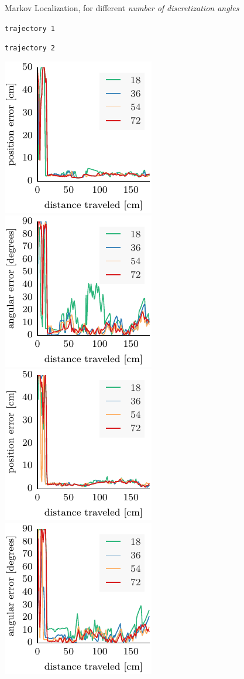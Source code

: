 \documentclass{svmult}
\begin{document}
\begin{figure}

\begin{center}
Markov Localization, for different \emph{number of discretization angles}
\end{center}
\begin{minipage}{.5\columnwidth}
\begin{center}
\texttt{trajectory~1}
\end{center}
\end{minipage}
\hfill
\begin{minipage}{.5\columnwidth}
\begin{center}
\texttt{trajectory~2}
\end{center}
\end{minipage}

\includegraphics[width=.24\columnwidth]{ml-whole_random_1-xy}\hfill
\includegraphics[width=.24\columnwidth]{ml-whole_random_1-theta}\hfill
\includegraphics[width=.24\columnwidth]{ml-whole_random_2-xy}\hfill
\includegraphics[width=.24\columnwidth]{ml-whole_random_2-theta}


\end{figure}
\end{document}
